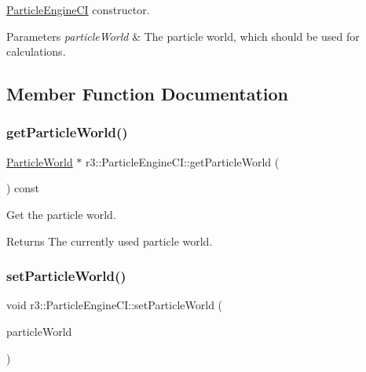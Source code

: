 \mbox{\hyperlink{classr3_1_1_particle_engine_c_i}{Particle\+Engine\+CI}} constructor. 


\begin{DoxyParams}{Parameters}
{\em particle\+World} & The particle world, which should be used for calculations. \\
\hline
\end{DoxyParams}


\subsection{Member Function Documentation}
\mbox{\label{classr3_1_1_particle_engine_c_i_af622bfe4b9279ffd5dcff14d43a8887b}} 
\subsubsection{\texorpdfstring{get\+Particle\+World()}{getParticleWorld()}}
{\footnotesize\ttfamily \mbox{\hyperlink{classr3_1_1_particle_world}{Particle\+World}} $\ast$ r3\+::\+Particle\+Engine\+C\+I\+::get\+Particle\+World (\begin{DoxyParamCaption}{ }\end{DoxyParamCaption}) const}



Get the particle world. 

\begin{DoxyReturn}{Returns}
The currently used particle world. 
\end{DoxyReturn}
\mbox{\label{classr3_1_1_particle_engine_c_i_ac3e59efbd738a6cf8195f5377cc4752c}} 
\subsubsection{\texorpdfstring{set\+Particle\+World()}{setParticleWorld()}}
{\footnotesize\ttfamily void r3\+::\+Particle\+Engine\+C\+I\+::set\+Particle\+World (\begin{DoxyParamCaption}\item[{\mbox{\hyperlink{classr3_1_1_particle_world}{Particle\+World}} $\ast$}]{particle\+World }\end{DoxyParamCaption})}



